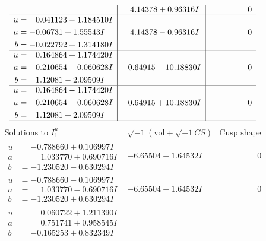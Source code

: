 \documentclass[1p]{elsarticle_modified}
\theoremstyle{definition}
\newcommand{\I}{\sqrt{-1}}
\begin{document}
$$\begin{array}{c|c|c}
 & \phantom{-}4.14378 + 0.96316 I & \phantom{-0.000000 } 0 \\ \hline\begin{aligned}
u &= \phantom{-}0.041123 - 1.184510 I \\
a &= -0.06731 + 1.55543 I \\
b &= -0.022792 + 1.314180 I\end{aligned}
 & \phantom{-}4.14378 - 0.96316 I & \phantom{-0.000000 } 0 \\ \hline\begin{aligned}
u &= \phantom{-}0.164864 + 1.174420 I \\
a &= -0.210654 + 0.060628 I \\
b &= \phantom{-}1.12081 - 2.09509 I\end{aligned}
 & \phantom{-}0.64915 - 10.18830 I & \phantom{-0.000000 } 0 \\ \hline\begin{aligned}
u &= \phantom{-}0.164864 - 1.174420 I \\
a &= -0.210654 - 0.060628 I \\
b &= \phantom{-}1.12081 + 2.09509 I\end{aligned}
 & \phantom{-}0.64915 + 10.18830 I & \phantom{-0.000000 } 0\\
 \hline 
 \end{array}$$\newpage$$\begin{array}{c|c|c}  
\text{Solutions to }I^u_{1}& \I (\text{vol} + \sqrt{-1}CS) & \text{Cusp shape}\\
 \hline 
\begin{aligned}
u &= -0.788660 + 0.106997 I \\
a &= \phantom{-}1.033770 + 0.690716 I \\
b &= -1.230520 - 0.630294 I\end{aligned}
 & -6.65504 + 1.64532 I & \phantom{-0.000000 } 0 \\ \hline\begin{aligned}
u &= -0.788660 - 0.106997 I \\
a &= \phantom{-}1.033770 - 0.690716 I \\
b &= -1.230520 + 0.630294 I\end{aligned}
 & -6.65504 - 1.64532 I & \phantom{-0.000000 } 0 \\ \hline\begin{aligned}
u &= \phantom{-}0.060722 + 1.211390 I \\
a &= \phantom{-}0.751741 + 0.958545 I \\
b &= -0.165253 + 0.832349 I\end{aligned}

\end{array}$$
\end{document}
